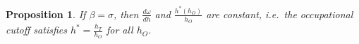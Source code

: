 \documentclass[onehalfspacing,11pt]{article}
\newtheorem{prp}{Proposition}
\begin{document}
		\begin{prp}
			If $\beta = \sigma$, then $\frac{d\omega}{dh}$ and $\frac{h^*(h_O)}{h_O}$ are constant, i.e.~the occupational cutoff satisfies $h^* = \frac{h_T}{h_O}$ for all $h_O$.
		\end{prp}
		
\end{document}
